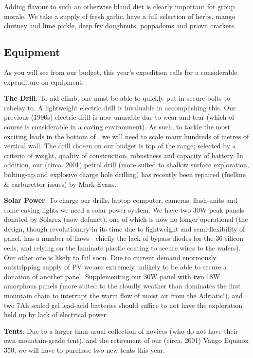 Adding flavour to such an otherwise bland diet is clearly important for group morale. We take a supply of fresh garlic, have a full selection of herbs, mango chutney and lime pickle, deep fry doughnuts, poppadoms and prawn crackers.


\subsection{Equipment}

As you will see from our budget, this year's expedition calls for a considerable expenditure on equipment.

\textbf{The Drill}: To aid climb, one must be able to quickly put in secure bolts to rebelay to. A lightweight electric drill is invaluable in accomplishing this. Our previous (1990s) electric drill is now unusable due to  wear and tear (which of course is considerable in a caving environment). As such, to tackle the most exciting leads in the bottom of , we will need to scale many hundreds of metres of vertical wall. The drill chosen on our budget is top of the range; selected by a criteria of weight, quality of construction, robustness and capacity of battery. In addition, our (circa. 2001) petrol drill (more suited to shallow surface exploration, bolting-up and explosive charge hole drilling) has recently been repaired (fuelline \& carburettor issues) by Mark Evans.

\textbf{Solar Power}: To charge our drills, laptop computer, cameras, flash-units and some caving lights we need a solar power system. We have two 30W peak panels donated by Solarex (now defunct), one of which is now no longer operational (the design, though revolutionary in its time due to lightweight and semi-flexibility of panel, has a number of flaws - chiefly the lack of bypass diodes for the 36 silicon cells, and relying on the laminate plastic coating to secure wires to the wafers). Our other one is likely to fail soon. Due to current demand enormously outstripping supply of PV we are extremely unlikely to be able to secure a donation of another panel. Supplementing our 30W panel with two 18W amorphous panels (more suited to the cloudly weather than dominates the first mountain chain to interrupt the warm flow of moist air from the Adriatic!), and two 7Ah sealed gel lead-acid batteries should suffice to not have the exploration held up by lack of electrical power.

\textbf{Tents}: Due to a larger than usual collection of novices (who do not have their own mountain-grade tent), and the retirement of our (circa. 2001) Vango Equinox 350, we will have to purchase two new tents this year.


